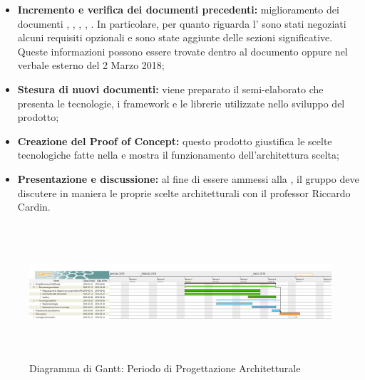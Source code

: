             \begin{itemize}
                \item \textbf{Incremento e verifica dei documenti precedenti:}
                    miglioramento dei documenti \NormeProgetto{}, \AnalisiRequisiti{},
                    \PianoProgetto{}, \PianoQualifica{}, \Glossario{}. In particolare, per quanto riguarda
                    l'\AnalisiRequisiti{} sono stati negoziati alcuni requisiti opzionali e sono state aggiunte
                    delle sezioni significative. Queste informazioni possono essere trovate dentro al documento \vAnalisiDeiRequisiti{}
                    oppure nel verbale esterno del 2 Marzo 2018;
                \item \textbf{Stesura di nuovi documenti:}
                    viene preparato il semi-elaborato \TecnologyBaseline{} che presenta le
                    tecnologie, i framework e le librerie utilizzate
                    nello sviluppo del prodotto;
                \item \textbf{Creazione del Proof of Concept:} questo prodotto giustifica le scelte tecnologiche
                    fatte nella \TecnologyBaseline{} e mostra il funzionamento dell'architettura scelta;
                \item \textbf{Presentazione e discussione:}
                    al fine di essere ammessi alla \RP{},
                    il gruppo \GroupName{} deve discutere in maniera 
                    le proprie scelte architetturali con il professor Riccardo Cardin.
            \end{itemize}
		
		
            \begin{figure}[H]
                \centering
                \includegraphics[width=1\linewidth, height=5cm]{./img/Gantt/ProgettazioneArchitetturale.png}

                \caption[Gantt - Progettazione architetturale]{Diagramma di Gantt: Periodo di Progettazione Architetturale}
            \end{figure}

